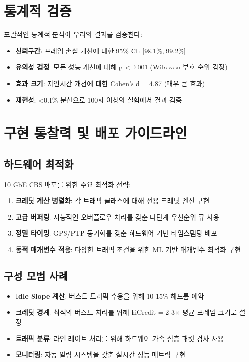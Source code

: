 \documentclass[12pt, a4paper]{article}
\begin{document}
\section{통계적 검증}

포괄적인 통계적 분석이 우리의 결과를 검증한다:

\begin{itemize}
    \item \textbf{신뢰구간}: 프레임 손실 개선에 대한 95\% CI: [98.1\%, 99.2\%]
    \item \textbf{유의성 검정}: 모든 성능 개선에 대해 p < 0.001 (Wilcoxon 부호 순위 검정)
    \item \textbf{효과 크기}: 지연시간 개선에 대한 Cohen's d = 4.87 (매우 큰 효과)
    \item \textbf{재현성}: <0.1\% 분산으로 100회 이상의 실험에서 결과 검증
\end{itemize}

\section{구현 통찰력 및 배포 가이드라인}

\subsection{하드웨어 최적화}

10 GbE CBS 배포를 위한 주요 최적화 전략:

\begin{enumerate}
    \item \textbf{크레딧 계산 병렬화}: 각 트래픽 클래스에 대해 전용 크레딧 엔진 구현
    \item \textbf{고급 버퍼링}: 지능적인 오버플로우 처리를 갖춘 다단계 우선순위 큐 사용
    \item \textbf{정밀 타이밍}: GPS/PTP 동기화를 갖춘 하드웨어 기반 타임스탬핑 배포
    \item \textbf{동적 매개변수 적응}: 다양한 트래픽 조건을 위한 ML 기반 매개변수 최적화 구현
\end{enumerate}

\subsection{구성 모범 사례}

\begin{itemize}
    \item \textbf{Idle Slope 계산}: 버스트 트래픽 수용을 위해 10-15\% 헤드룸 예약
    \item \textbf{크레딧 경계}: 최적의 버스트 처리를 위해 hiCredit = 2-3× 평균 프레임 크기로 설정
    \item \textbf{트래픽 분류}: 라인 레이트 처리를 위해 하드웨어 가속 심층 패킷 검사 사용
    \item \textbf{모니터링}: 자동 알림 시스템을 갖춘 실시간 성능 메트릭 구현
\end{itemize}
\end{document}
